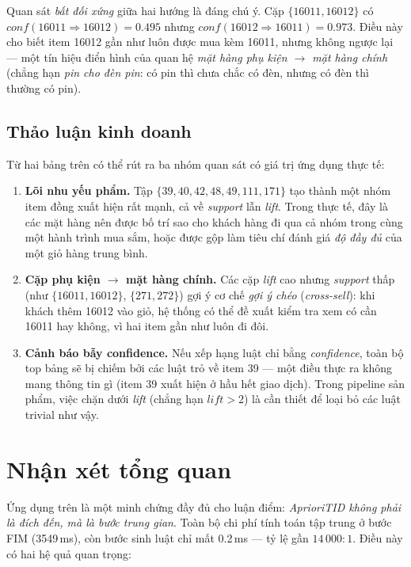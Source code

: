 Quan sát \emph{bất đối xứng} giữa hai hướng là đáng chú ý. Cặp $\{16011, 16012\}$ có $\textit{conf}(16011 \Rightarrow 16012) = 0.495$ nhưng $\textit{conf}(16012 \Rightarrow 16011) = 0.973$. Điều này cho biết item 16012 gần như luôn được mua kèm 16011, nhưng không ngược lại --- một tín hiệu điển hình của quan hệ \emph{mặt hàng phụ kiện $\to$ mặt hàng chính} (chẳng hạn \emph{pin cho đèn pin}: có pin thì chưa chắc có đèn, nhưng có đèn thì thường có pin).

\subsection{Thảo luận kinh doanh}

Từ hai bảng trên có thể rút ra ba nhóm quan sát có giá trị ứng dụng thực tế:

\begin{enumerate}
    \item \textbf{Lõi nhu yếu phẩm.} Tập $\{39, 40, 42, 48, 49, 111, 171\}$ tạo thành một nhóm item đồng xuất hiện rất mạnh, cả về \textit{support} lẫn \textit{lift}. Trong thực tế, đây là các mặt hàng nên được bố trí sao cho khách hàng đi qua cả nhóm trong cùng một hành trình mua sắm, hoặc được gộp làm tiêu chí đánh giá \emph{độ đầy đủ} của một giỏ hàng trung bình.
    \item \textbf{Cặp phụ kiện $\to$ mặt hàng chính.} Các cặp \textit{lift} cao nhưng \textit{support} thấp (như $\{16011, 16012\}$, $\{271, 272\}$) gợi ý cơ chế \emph{gợi ý chéo} (\textit{cross-sell}): khi khách thêm 16012 vào giỏ, hệ thống có thể đề xuất kiểm tra xem có cần 16011 hay không, vì hai item gần như luôn đi đôi.
    \item \textbf{Cảnh báo bẫy confidence.} Nếu xếp hạng luật chỉ bằng \textit{confidence}, toàn bộ top bảng sẽ bị chiếm bởi các luật trỏ về item 39 --- một điều thực ra không mang thông tin gì (item 39 xuất hiện ở hầu hết giao dịch). Trong pipeline sản phẩm, việc chặn dưới \textit{lift} (chẳng hạn $\textit{lift} > 2$) là cần thiết để loại bỏ các luật trivial như vậy.
\end{enumerate}

\section{Nhận xét tổng quan}
\label{sec:mba-discussion}

Ứng dụng trên là một minh chứng đầy đủ cho luận điểm: \emph{AprioriTID không phải là đích đến, mà là bước trung gian}. Toàn bộ chi phí tính toán tập trung ở bước FIM (3549\,ms), còn bước sinh luật chỉ mất 0.2\,ms --- tỷ lệ gần $14\,000 \colon 1$. Điều này có hai hệ quả quan trọng:

